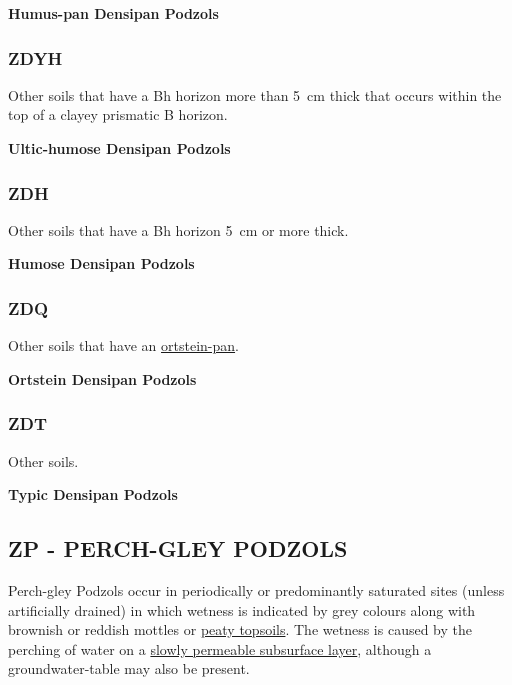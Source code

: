 \documentclass[
  letterpaper,
  DIV=11,
  numbers=noendperiod]{scrreprt}
\begin{document}
\textbf{Humus-pan Densipan Podzols}

\hypertarget{sec-key-ZDYH}{%
\subsubsection{\texorpdfstring{\textbf{ZDYH}}{ZDYH}}\label{sec-key-ZDYH}}

Other soils that have a Bh horizon more than 5~cm thick that occurs
within the top of a clayey prismatic B horizon.

\textbf{Ultic-humose Densipan Podzols}

\hypertarget{sec-key-ZDH}{%
\subsubsection{\texorpdfstring{\textbf{ZDH}}{ZDH}}\label{sec-key-ZDH}}

Other soils that have a Bh horizon 5~cm or more thick.

\textbf{Humose Densipan Podzols}

\hypertarget{sec-key-ZDQ}{%
\subsubsection{\texorpdfstring{\textbf{ZDQ}}{ZDQ}}\label{sec-key-ZDQ}}

Other soils that have an
\protect\hyperlink{sec-diag-opan}{ortstein-pan}.

\textbf{Ortstein Densipan Podzols}

\hypertarget{sec-key-ZDT}{%
\subsubsection{\texorpdfstring{\textbf{ZDT}}{ZDT}}\label{sec-key-ZDT}}

Other soils.

\textbf{Typic Densipan Podzols}

\hypertarget{sec-ZP}{%
\subsection{\texorpdfstring{\textbf{ZP} - PERCH-GLEY
PODZOLS}{ZP - PERCH-GLEY PODZOLS}}\label{sec-ZP}}

Perch-gley Podzols occur in periodically or predominantly saturated
sites (unless artificially drained) in which wetness is indicated by
grey colours along with brownish or reddish mottles or
\protect\hyperlink{sec-diag-pts}{peaty topsoils}. The wetness is caused
by the perching of water on a \protect\hyperlink{sec-diag-slowp}{slowly
permeable subsurface layer}, although a groundwater-table may also be
present.
\end{document}
